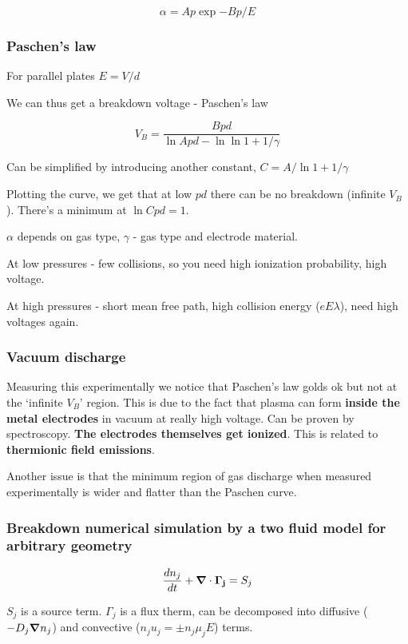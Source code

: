 \documentclass[PlasmaNotes.tex]{subfiles}
\begin{document}
\[ \alpha = A p \exp{-B p/E} \]

\subsubsection{Paschen's law}

For parallel plates $E=V/d$

We can thus get a breakdown voltage - Paschen's law

\[ V_B = \frac{B p d}{\ln{A pd} - \ln{\ln{ 1 + 1/\gamma}}} \]

Can be simplified by introducing another constant, $C=A/\ln{1+1/\gamma}$

Plotting the curve, we get that at low $pd$ there can be no breakdown (infinite $V_B$). There's a minimum at $\ln{C pd} =1 $.

$\alpha$ depends on gas type, $\gamma$ - gas type and electrode material.

At low pressures - few collisions, so you need high ionization probability, high voltage.

At high pressures -  short mean free path, high collision energy ($eE\lambda$), need high voltages again.

\subsubsection{Vacuum discharge}

Measuring this experimentally we notice that Paschen's law golds ok but not at the `infinite $V_B$' region. This is due to the fact that plasma can form \textbf{inside the metal electrodes} in vacuum at really high voltage. Can be proven by spectroscopy. \textbf{The electrodes themselves get ionized}. This is related to \textbf{thermionic field emissions}.

Another issue is that the minimum region of gas discharge when measured experimentally is wider and flatter than the Paschen curve.

\subsubsection{Breakdown numerical simulation by a two fluid model for arbitrary geometry}

\[ \frac{d n_j}{d t} + \mbox{\boldmath$ \nabla $} \cdot \mathbf{\Gamma_j} = S_j \]

$S_j$ is a source term. $\Gamma_j$ is a flux therm, can be decomposed into diffusive ($-D_j \mbox{\boldmath$ \nabla $} n_j$) and convective ($n_j u_j = \pm n_j \mu_j E$)  terms. 
\end{document}
